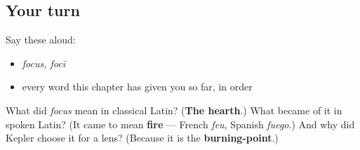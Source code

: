 \subsection*{Your turn}
Say these aloud:

\begin{itemize}
\raggedright
  \item \emph{focus, focī}
  \item every word this chapter has given you so far, in order
\end{itemize}

\begin{tcolorbox}[breakable,colback=teal!4,colframe=teal!35!black,title={Before you move on}]
What did \emph{focus} mean in classical Latin? (\textbf{The hearth}.) What became of it in spoken Latin? (It came to mean \textbf{fire} — French \emph{feu}, Spanish \emph{fuego}.) And why did Kepler choose it for a lens? (Because it is the \textbf{burning-point}.)
\end{tcolorbox}

